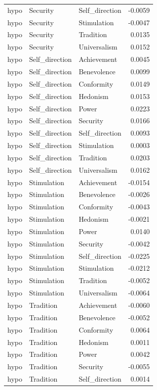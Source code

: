 \begin{tabular}{lllr}
hypo & Security & Self\_direction & -0.0059 \\
hypo & Security & Stimulation & -0.0047 \\
hypo & Security & Tradition & 0.0135 \\
hypo & Security & Universalism & 0.0152 \\
hypo & Self\_direction & Achievement & 0.0045 \\
hypo & Self\_direction & Benevolence & 0.0099 \\
hypo & Self\_direction & Conformity & 0.0149 \\
hypo & Self\_direction & Hedonism & 0.0153 \\
hypo & Self\_direction & Power & 0.0223 \\
hypo & Self\_direction & Security & 0.0166 \\
hypo & Self\_direction & Self\_direction & 0.0093 \\
hypo & Self\_direction & Stimulation & 0.0003 \\
hypo & Self\_direction & Tradition & 0.0203 \\
hypo & Self\_direction & Universalism & 0.0162 \\
hypo & Stimulation & Achievement & -0.0154 \\
hypo & Stimulation & Benevolence & -0.0026 \\
hypo & Stimulation & Conformity & -0.0043 \\
hypo & Stimulation & Hedonism & -0.0021 \\
hypo & Stimulation & Power & 0.0140 \\
hypo & Stimulation & Security & -0.0042 \\
hypo & Stimulation & Self\_direction & -0.0225 \\
hypo & Stimulation & Stimulation & -0.0212 \\
hypo & Stimulation & Tradition & -0.0052 \\
hypo & Stimulation & Universalism & -0.0064 \\
hypo & Tradition & Achievement & -0.0060 \\
hypo & Tradition & Benevolence & -0.0052 \\
hypo & Tradition & Conformity & 0.0064 \\
hypo & Tradition & Hedonism & 0.0011 \\
hypo & Tradition & Power & 0.0042 \\
hypo & Tradition & Security & -0.0055 \\
hypo & Tradition & Self\_direction & 0.0014 \\

\end{tabular}
